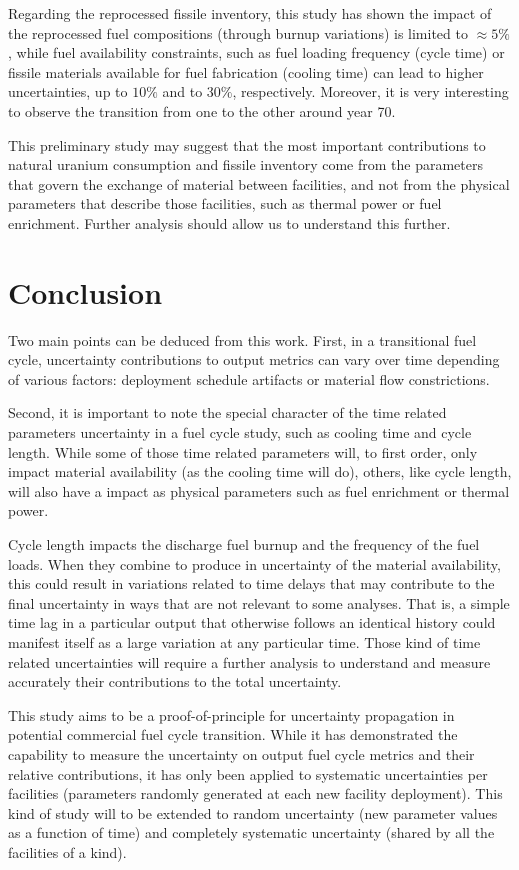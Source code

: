 \documentclass{anstrans}
\begin{document}
Regarding the reprocessed fissile inventory, this study has shown the 
impact of the reprocessed fuel compositions (through burnup variations) is
limited to $\approx5\%$, while fuel availability constraints, such as fuel loading frequency (cycle
time) or fissile materials available for fuel fabrication (cooling time) can lead to higher
uncertainties, up to $10\%$ and to $30\%$, respectively.  Moreover, it is very
interesting to observe the transition from one to the other around
year 70.

This preliminary study may suggest that the most important contributions to
natural uranium consumption and fissile inventory come from the parameters that
govern the exchange of material between facilities, and not
from the physical parameters that describe those facilities, such as thermal power or fuel enrichment. Further
analysis should allow us to understand this further.

\section{Conclusion}

Two main points can be deduced from this work.  First, in a transitional
fuel cycle, uncertainty contributions to output metrics can vary over time
depending of various factors: deployment schedule artifacts or material flow constrictions.

Second, it is important to note the special character of the time related
parameters uncertainty in a fuel cycle study, such as cooling time and cycle
length.  While some of those time related parameters will, to first order, only
impact material availability (as the cooling time will do), others, like
cycle length, will also have a impact as physical parameters such as fuel
enrichment or thermal power.  

Cycle length impacts the discharge fuel burnup and  the frequency of
the fuel loads.  When they combine to produce in uncertainty of the
material availability, this could result in variations related to time delays that may
contribute to the final uncertainty in ways that are not relevant to some analyses.
That is, a simple time lag in a particular output that otherwise follows an identical history
could manifest itself as a large variation at any particular time.
Those kind of time related uncertainties will require a further analysis
to understand and measure accurately their
contributions to the total uncertainty.

This study aims to be a proof-of-principle for uncertainty propagation in
potential commercial fuel cycle transition.  While it has demonstrated the
capability to measure the uncertainty on output fuel cycle metrics and their
relative contributions, it has only been applied to systematic uncertainties per
facilities (parameters randomly generated at each new facility deployment).
This kind of study will to be extended to random uncertainty (new parameter
values as a function of time) and completely systematic uncertainty (shared by all
the facilities of a kind).
\end{document}
